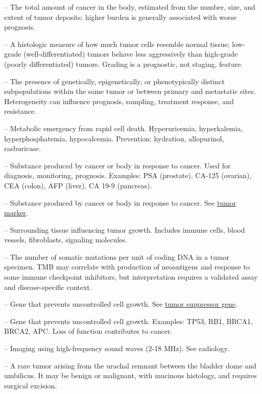 -- The total amount of cancer in the body, estimated from the number, size, and extent of tumor deposits; higher burden is generally associated with worse prognosis.

-- A histologic measure of how much tumor cells resemble normal tissue; low-grade (well-differentiated) tumors behave less aggressively than high-grade (poorly differentiated) tumors. Grading is a prognostic, not staging, feature.

-- The presence of genetically, epigenetically, or phenotypically distinct subpopulations within the same tumor or between primary and metastatic sites. Heterogeneity can influence prognosis, sampling, treatment response, and resistance.

-- Metabolic emergency from rapid cell death. Hyperuricemia, hyperkalemia, hyperphosphatemia, hypocalcemia. Prevention: hydration, allopurinol, rasburicase.

-- Substance produced by cancer or body in response to cancer. Used for diagnosis, monitoring, prognosis. Examples: PSA (prostate), CA-125 (ovarian), CEA (colon), AFP (liver), CA 19-9 (pancreas).

-- Substance produced by cancer or body in response to cancer. See \hyperlink{Tumor Marker}{tumor marker}.

-- Surrounding tissue influencing tumor growth. Includes immune cells, blood vessels, fibroblasts, signaling molecules.

-- The number of somatic mutations per unit of coding DNA in a tumor specimen. TMB may correlate with production of neoantigens and response to some immune checkpoint inhibitors, but interpretation requires a validated assay and disease-specific context.

-- Gene that prevents uncontrolled cell growth. See \hyperlink{Tumor Suppressor Gene}{tumor suppressor gene}.

-- Gene that prevents uncontrolled cell growth. Examples: TP53, RB1, BRCA1, BRCA2, APC. Loss of function contributes to cancer.

-- Imaging using high-frequency sound waves (2-18 MHz). See radiology.

-- A rare tumor arising from the urachal remnant between the bladder dome and umbilicus. It may be benign or malignant, with mucinous histology, and requires surgical excision.

